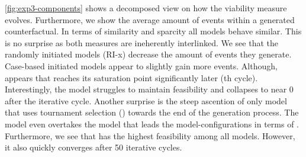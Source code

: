 \documentclass[./../../paper.tex]{subfiles}
\begin{document}
\autoref{fig:exp3-components} shows a decomposed view on how the viability measure evolves. Furthermore, we show the average amount of events within a generated counterfactual. 
In terms of similarity and sparcity all models behave similar. This is no surprise as both measures are ineherently interlinked. 
We see that the randomly initiated models (RI-x) decrease the amount of events they generate. 
Case-based initiated models appear to slightly gain more events. Although,   appears that reaches its saturation point significantly later (th cycle).
Interestingly, the  model struggles to maintain feasibility and collapses to near 0 after the  iterative cycle. 
Another surprise is the steep ascention of only model that uses tournament selection () towards the end of the generation process. The  model even overtakes the model that leads the model-configurations in terms of . 
Furthermore, we see that  has the highest feasibility among all models. However, it also quickly converges after 50 iterative cycles.    
   



\end{document}
